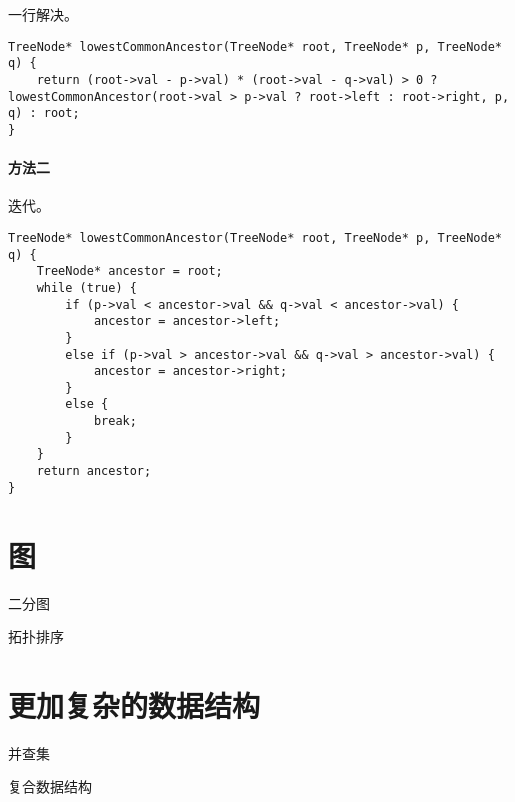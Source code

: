 \documentclass[lang=cn,10pt]{elegantbook}
\begin{document}
一行解决。

\begin{lstlisting}
TreeNode* lowestCommonAncestor(TreeNode* root, TreeNode* p, TreeNode* q) {
	return (root->val - p->val) * (root->val - q->val) > 0 ? lowestCommonAncestor(root->val > p->val ? root->left : root->right, p, q) : root;
}
\end{lstlisting}

\subsubsection*{方法二}

迭代。

\begin{lstlisting}
TreeNode* lowestCommonAncestor(TreeNode* root, TreeNode* p, TreeNode* q) {
	TreeNode* ancestor = root;
	while (true) {
		if (p->val < ancestor->val && q->val < ancestor->val) {
			ancestor = ancestor->left;
		}
		else if (p->val > ancestor->val && q->val > ancestor->val) {
			ancestor = ancestor->right;
		}
		else {
			break;
		}
	}
	return ancestor;
}
\end{lstlisting}

\chapter{图}

\begin{introduction}[前情提要]
	\item 二分图
	\item 拓扑排序
\end{introduction}

\chapter{更加复杂的数据结构}

\begin{introduction}[前情提要]
	\item 并查集
	\item 复合数据结构
\end{introduction}
	
\end{document}
